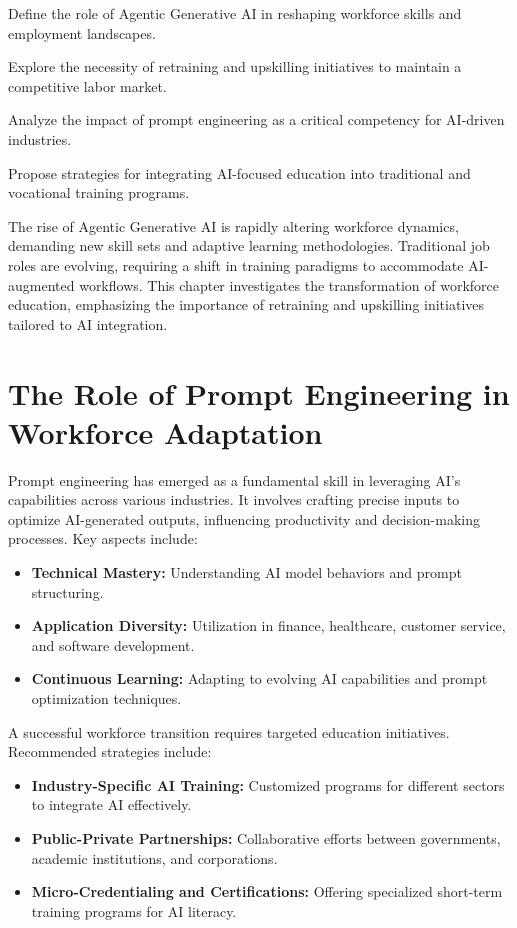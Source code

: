 \documentclass[a4paper,headinclude=on,footinclude=on,12pt,oneside]{scrbook}
\begin{document}
\begin{arrows}
	\item Define the role of Agentic Generative AI in reshaping workforce skills and employment landscapes.
	\item Explore the necessity of retraining and upskilling initiatives to maintain a competitive labor market.
	\item Analyze the impact of prompt engineering as a critical competency for AI-driven industries.
	\item Propose strategies for integrating AI-focused education into traditional and vocational training programs.
\end{arrows}


The rise of Agentic Generative AI is rapidly altering workforce dynamics, demanding new skill sets and adaptive learning methodologies. Traditional job roles are evolving, requiring a shift in training paradigms to accommodate AI-augmented workflows. This chapter investigates the transformation of workforce education, emphasizing the importance of retraining and upskilling initiatives tailored to AI integration.

\section{The Role of Prompt Engineering in Workforce Adaptation}

Prompt engineering has emerged as a fundamental skill in leveraging AI’s capabilities across various industries. It involves crafting precise inputs to optimize AI-generated outputs, influencing productivity and decision-making processes. Key aspects include:
\begin{itemize}
	\item \textbf{Technical Mastery:} Understanding AI model behaviors and prompt structuring.
	\item \textbf{Application Diversity:} Utilization in finance, healthcare, customer service, and software development.
	\item \textbf{Continuous Learning:} Adapting to evolving AI capabilities and prompt optimization techniques.
\end{itemize}


A successful workforce transition requires targeted education initiatives. Recommended strategies include:
\begin{itemize}
	\item \textbf{Industry-Specific AI Training:} Customized programs for different sectors to integrate AI effectively.
	\item \textbf{Public-Private Partnerships:} Collaborative efforts between governments, academic institutions, and corporations.
	\item \textbf{Micro-Credentialing and Certifications:} Offering specialized short-term training programs for AI literacy.
\end{itemize}
\end{document}
